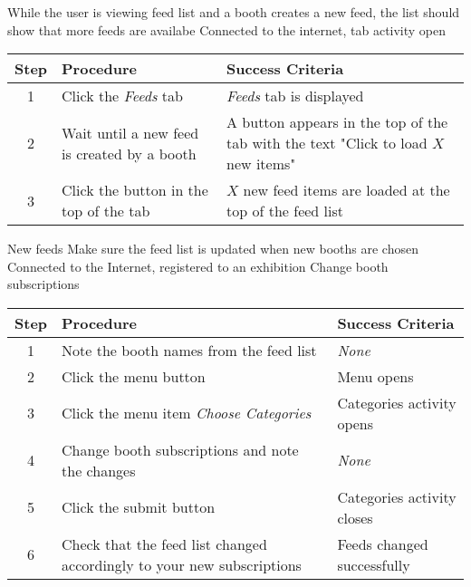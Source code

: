 \testcase
{\casefour}
{While the user is viewing feed list and a booth creates a new feed, the list should show that more feeds are availabe}
{Connected to the internet, tab activity open}
{}

\begin{center}
\begin{tabular}{| c | p{4.6cm} | p{4.6cm} |}
\hline
\textbf{Step} & \textbf{Procedure} & \textbf{Success Criteria}\\
\hline
1 & Click the \textit{Feeds} tab & \textit{Feeds} tab is displayed\\
\hline
2 & Wait until a new feed is created by a booth & A button appears in the top of the tab with the text "Click to load $X$ new items"\\
\hline
3 & Click the button in the top of the tab & $X$ new feed items are loaded at the top of the feed list\\
\hline
\end{tabular}
\end{center}


\newcommand{\casefive}{New feeds}
\newcommand{\casesix}{Register a user}
\newcommand{\caseseven}{Snap to booth}
\newcommand{\caseeight}{Navigate to booth}
\newcommand{\casenine}{Register new exhibition}

\testcase
{\casefive}
{Make sure the feed list is updated when new booths are chosen}
{Connected to the Internet, registered to an exhibition}
{Change booth subscriptions}

\begin{center}
\begin{tabular}{| c | p{4.6cm} | p{4.6cm} |}
\hline
\textbf{Step} & \textbf{Procedure} & \textbf{Success Criteria}\\
\hline
1 & Note the booth names from the feed list & \textit{None}\\
\hline
2 & Click the menu button & Menu opens\\
\hline
3 & Click the menu item \textit{Choose Categories} & Categories activity opens\\
\hline
4 & Change booth subscriptions and note the changes & \textit{None}\\
\hline
5 & Click the submit button & Categories activity closes\\
\hline
6 & Check that the feed list changed accordingly to your new subscriptions & Feeds changed successfully\\
\hline
\end{tabular}
\end{center}

